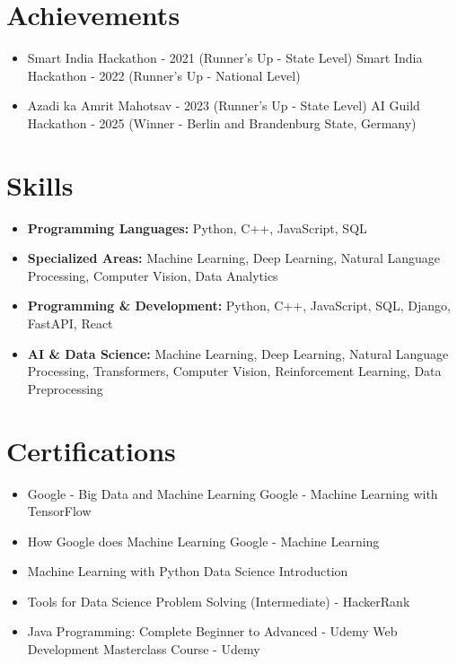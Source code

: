 \documentclass[a4paper,10pt]{article}
\begin{document}
\section*{Achievements}
\begin{itemize}
\item Smart India Hackathon - 2021 (Runner's Up - State Level) \hfill Smart India Hackathon - 2022 (Runner's Up - National Level)
\item Azadi ka Amrit Mahotsav - 2023 (Runner's Up - State Level) \hfill AI Guild Hackathon - 2025 (Winner - Berlin and Brandenburg State, Germany)
\end{itemize}

\section*{Skills}
\begin{itemize}
  \item \textbf{Programming Languages:} Python, C++, JavaScript, SQL
  \item \textbf{Specialized Areas:} Machine Learning, Deep Learning, Natural Language Processing, Computer Vision, Data Analytics
  \item \textbf{Programming \& Development:} Python, C++, JavaScript, SQL, Django, FastAPI, React
  \item \textbf{AI \& Data Science:} Machine Learning, Deep Learning, Natural Language Processing, Transformers, Computer Vision, Reinforcement Learning, Data Preprocessing
\end{itemize}

\section*{Certifications}
\begin{itemize}
\item Google - Big Data and Machine Learning \hfill Google - Machine Learning with TensorFlow
\item How Google does Machine Learning \hfill Google - Machine Learning
\item Machine Learning with Python \hfill Data Science Introduction
\item Tools for Data Science \hfill Problem Solving (Intermediate) - HackerRank
\item Java Programming: Complete Beginner to Advanced - Udemy \hfill Web Development Masterclass Course - Udemy
\end{itemize}
\end{document}
